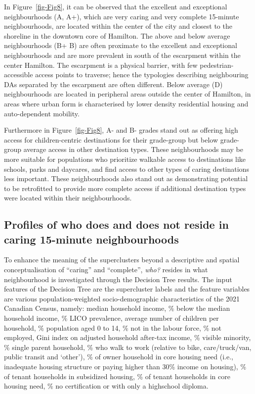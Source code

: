 \documentclass[
  authoryear,
  preprint,
  3p]{elsarticle}
\begin{document}
In Figure~\ref{fig-Fig8}, it can be observed that the excellent and
exceptional neighbourhoods (A, A+), which are very caring and very
complete 15-minute neighbourhoods, are located within the center of the
city and closest to the shoreline in the downtown core of Hamilton. The
above and below average neighbourhoods (B+ B) are often proximate to the
excellent and exceptional neighbourhoods and are more prevalent in south
of the escarpment within the center Hamilton. The escarpment is a
physical barrier, with few pedestrian-accessible access points to
traverse; hence the typologies describing neighbouring DAs separated by
the escarpment are often different. Below average (D) neighbourhoods are
located in peripheral areas outside the center of Hamilton, in areas
where urban form is characterised by lower density residential housing
and auto-dependent mobility.

Furthermore in Figure~\ref{fig-Fig8}, A- and B- grades stand out as
offering high access for children-centric destinations for their
grade-group but below grade-group average access in other destination
types. These neighbourhoods may be more suitable for populations who
prioritize walkable access to destinations like schools, parks and
daycares, and find access to other types of caring destinations less
important. These neighbourhoods also stand out as demonstrating
potential to be retrofitted to provide more complete access if
additional destination types were located within their neighbourhoods.

\subsection{Profiles of who does and does not reside in caring 15-minute
neighbourhoods}\label{profiles-of-who-does-and-does-not-reside-in-caring-15-minute-neighbourhoods}

To enhance the meaning of the superclusters beyond a descriptive and
spatial conceptualisation of ``caring'' and ``complete'', \emph{who?}
resides in what neighbourhood is investigated through the Decision Tree
results. The input features of the Decision Tree are the supercluster
labels and the feature variables are various population-weighted
socio-demographic characteristics of the 2021 Canadian Census, namely:
median household income, \% below the median household income, \% LICO
prevalence, average number of children per household, \% population aged
0 to 14, \% not in the labour force, \% not employed, Gini index on
adjusted household after-tax income, \% visible minority, \% single
parent household, \% who walk to work (relative to bike, care/truck/van,
public transit and `other'), \% of owner household in core housing need
(i.e., inadequate housing structure or paying higher than 30\% income on
housing), \% of tenant households in subsidized housing, \% of tenant
households in core housing need, \% no certification or with only a
highschool diploma.
\end{document}
